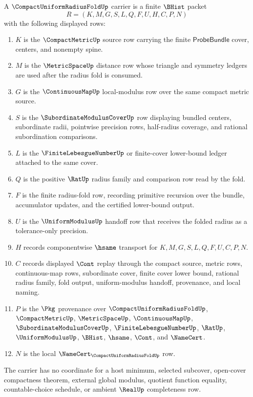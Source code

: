 \begin{definition}
\label{def:compact-uniform-radius-fold-carrier}
A $\CompactUniformRadiusFoldUp$ carrier is a finite $\BHist$ packet
$$
R=(K,M,G,S,L,Q,F,U,H,C,P,N)
$$
with the following displayed rows:
\begin{enumerate}
\item $K$ is the $\CompactMetricUp$ source row carrying the finite $\mathsf{ProbeBundle}$ cover, centers, and nonempty spine.
\item $M$ is the $\MetricSpaceUp$ distance row whose triangle and symmetry ledgers are used after the radius fold is consumed.
\item $G$ is the $\ContinuousMapUp$ local-modulus row over the same compact metric source.
\item $S$ is the $\SubordinateModulusCoverUp$ row displaying bundled centers, subordinate radii, pointwise precision rows, half-radius coverage, and rational subordination comparisons.
\item $L$ is the $\FiniteLebesgueNumberUp$ or finite-cover lower-bound ledger attached to the same cover.
\item $Q$ is the positive $\RatUp$ radius family and comparison row read by the fold.
\item $F$ is the finite radius-fold row, recording primitive recursion over the bundle, accumulator updates, and the certified lower-bound output.
\item $U$ is the $\UniformModulusUp$ handoff row that receives the folded radius as a tolerance-only precision.
\item $H$ records componentwise $\hsame$ transport for $K,M,G,S,L,Q,F,U,C,P,N$.
\item $C$ records displayed $\Cont$ replay through the compact source, metric rows, continuous-map rows, subordinate cover, finite cover lower bound, rational radius family, fold output, uniform-modulus handoff, provenance, and local naming.
\item $P$ is the $\Pkg$ provenance over $\CompactUniformRadiusFoldUp$, $\CompactMetricUp$, $\MetricSpaceUp$, $\ContinuousMapUp$, $\SubordinateModulusCoverUp$, $\FiniteLebesgueNumberUp$, $\RatUp$, $\UniformModulusUp$, $\BHist$, $\hsame$, $\Cont$, and $\NameCert$.
\item $N$ is the local $\NameCert_{\CompactUniformRadiusFoldUp}$ row.
\end{enumerate}
The carrier has no coordinate for a host minimum, selected subcover, open-cover compactness theorem, external global modulus, quotient function equality, countable-choice schedule, or ambient $\RealUp$ completeness row.
\end{definition}

